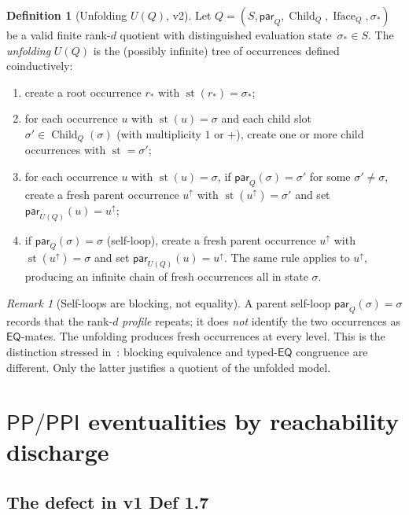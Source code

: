 \documentclass[11pt]{article}
\theoremstyle{definition}
\newtheorem{definition}[theorem]{Definition}
\theoremstyle{remark}
\newtheorem{remark}[theorem]{Remark}
\newcommand{\PP}{\mathsf{PP}}
\newcommand{\PPI}{\mathsf{PPI}}
\newcommand{\EQ}{\mathsf{EQ}}
\newcommand{\Child}{\operatorname{Child}}
\newcommand{\Iface}{\operatorname{Iface}}
\newcommand{\st}{\operatorname{st}}
\begin{document}
\begin{definition}[Unfolding $U(Q)$, v2]\label{def:UQ-v2}
Let $Q = (S, \mathsf{par}_Q, \Child_Q, \Iface_Q, \sigma_\ast)$ be
a valid finite rank-$d$ quotient with distinguished evaluation
state~$\sigma_\ast \in S$. The \emph{unfolding} $U(Q)$ is the
(possibly infinite) tree of occurrences defined coinductively:
\begin{enumerate}
\item create a root occurrence $r_\ast$ with $\st(r_\ast) =
  \sigma_\ast$;
\item for each occurrence $u$ with $\st(u) = \sigma$ and each
  child slot $\sigma' \in \Child_Q(\sigma)$ (with multiplicity
  $1$ or $+$), create one or more child occurrences with
  $\st = \sigma'$;
\item for each occurrence $u$ with $\st(u) = \sigma$, if
  $\mathsf{par}_Q(\sigma) = \sigma'$ for some $\sigma' \neq
  \sigma$, create a fresh parent occurrence $u^\uparrow$ with
  $\st(u^\uparrow) = \sigma'$ and set
  $\mathsf{par}_{U(Q)}(u) = u^\uparrow$;
\item if $\mathsf{par}_Q(\sigma) = \sigma$ (self-loop), create a
  fresh parent occurrence $u^\uparrow$ with $\st(u^\uparrow) =
  \sigma$ and set $\mathsf{par}_{U(Q)}(u) = u^\uparrow$. The same
  rule applies to $u^\uparrow$, producing an infinite chain of
  fresh occurrences all in state $\sigma$.
\end{enumerate}
\end{definition}

\begin{remark}[Self-loops are blocking, not equality]
A parent self-loop $\mathsf{par}_Q(\sigma) = \sigma$ records that
the rank-$d$ \emph{profile} repeats; it does \emph{not} identify
the two occurrences as $\EQ$-mates. The unfolding produces fresh
occurrences at every level. This is the distinction stressed
in~\cite{GPT55Survival}: blocking equivalence and typed-$\EQ$
congruence are different.  Only the latter justifies a quotient
of the unfolded model.
\end{remark}

\section{$\PP/\PPI$ eventualities by reachability discharge}
\label{sec:eventualities}

\subsection{The defect in v1 Def 1.7}
\end{document}
